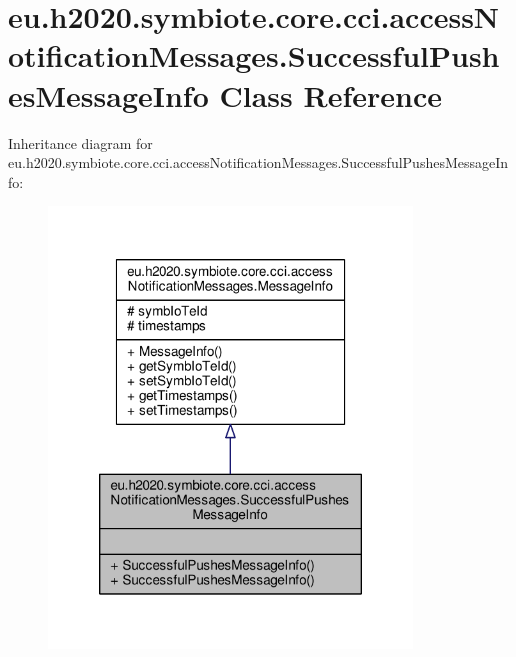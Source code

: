 \hypertarget{classeu_1_1h2020_1_1symbiote_1_1core_1_1cci_1_1accessNotificationMessages_1_1SuccessfulPushesMessageInfo}{}\section{eu.\+h2020.\+symbiote.\+core.\+cci.\+access\+Notification\+Messages.\+Successful\+Pushes\+Message\+Info Class Reference}
\label{classeu_1_1h2020_1_1symbiote_1_1core_1_1cci_1_1accessNotificationMessages_1_1SuccessfulPushesMessageInfo}


Inheritance diagram for eu.\+h2020.\+symbiote.\+core.\+cci.\+access\+Notification\+Messages.\+Successful\+Pushes\+Message\+Info\+:
\nopagebreak
\begin{figure}[H]
\begin{center}
\leavevmode
\includegraphics[width=274pt]{classeu_1_1h2020_1_1symbiote_1_1core_1_1cci_1_1accessNotificationMessages_1_1SuccessfulPushesMessageInfo__inherit__graph}
\end{center}
\end{figure}


